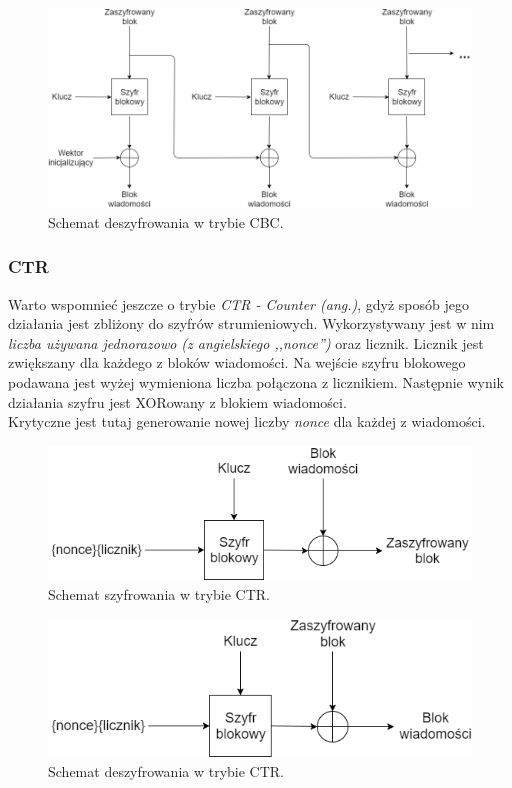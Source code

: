 \begin{figure}
    \centering
	\includegraphics[width=\textwidth]{content/images/cbc-dec-scheme}
    \caption{Schemat deszyfrowania w trybie CBC.}
\end{figure}

\subsubsection{CTR}
Warto wspomnieć jeszcze o trybie \textit{CTR - Counter (ang.)}, gdyż sposób jego działania jest zbliżony 
do szyfrów strumieniowych. Wykorzystywany jest w nim \textit{liczba używana jednorazowo (z angielskiego ,,nonce'')}
oraz licznik. Licznik jest zwiększany dla każdego z bloków wiadomości. 
Na wejście szyfru blokowego podawana jest wyżej wymieniona liczba połączona z licznikiem. Następnie wynik
działania szyfru jest XORowany z blokiem wiadomości. \\
Krytyczne jest tutaj generowanie nowej liczby \textit{nonce} dla każdej z wiadomości. 

\begin{figure}[H]
    \centering
	\includegraphics[width=\textwidth]{content/images/ctr-enc-scheme}
    \caption{Schemat szyfrowania w trybie CTR.}
\end{figure}
\begin{figure}[H]
    \centering
	\includegraphics[width=\textwidth]{content/images/ctr-dec-scheme}
    \caption{Schemat deszyfrowania w trybie CTR.}
\end{figure}

